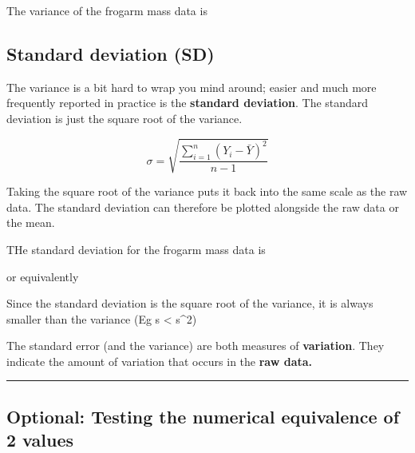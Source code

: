 \documentclass[]{book}
\newenvironment{Shaded}{\begin{snugshade}}{\end{snugshade}}
\newcommand{\KeywordTok}[1]{\textcolor[rgb]{0.13,0.29,0.53}{\textbf{#1}}}
\newcommand{\OperatorTok}[1]{\textcolor[rgb]{0.81,0.36,0.00}{\textbf{#1}}}
\newcommand{\NormalTok}[1]{#1}
\theoremstyle{definition}
\theoremstyle{definition}
\theoremstyle{definition}
\theoremstyle{remark}
\begin{document}
The variance of the frogarm mass data is

\begin{Shaded}
\end{Shaded}

\subsection{Standard deviation (SD)}\label{standard-deviation-sd}

The variance is a bit hard to wrap you mind around; easier and much more
frequently reported in practice is the \textbf{standard deviation}. The
standard deviation is just the square root of the variance.

\[\sigma = \sqrt{\frac{\sum\limits_{i=1}^{n} \left(Y_{i} - \bar{Y}\right)^{2}} {n-1}}\]

Taking the square root of the variance puts it back into the same scale
as the raw data. The standard deviation can therefore be plotted
alongside the raw data or the mean.

THe standard deviation for the frogarm mass data is

or equivalently

\begin{Shaded}
\end{Shaded}

Since the standard deviation is the square root of the variance, it is
always smaller than the variance (Eg s \textless{} s\^{}2)

The standard error (and the variance) are both measures of
\textbf{variation}. They indicate the amount of variation that occurs in
the \textbf{raw data.}

\begin{center}\rule{0.5\linewidth}{\linethickness}\end{center}

\subsection{Optional: Testing the numerical equivalence of 2
values}\label{optional-testing-the-numerical-equivalence-of-2-values}
\end{document}
